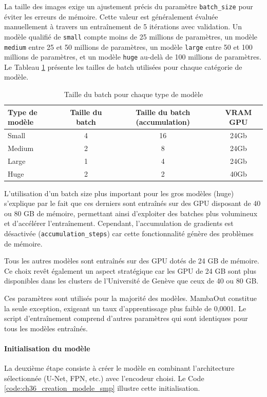 La taille des images exige un ajustement précis du paramètre \texttt{batch\_size} pour éviter les erreurs de mémoire. Cette valeur est généralement évaluée manuellement à travers un entraînement de 5 itérations avec validation. Un modèle qualifié de \texttt{small} compte moins de 25 millions de paramètres, un modèle \texttt{medium} entre 25 et 50 millions de paramètres, un modèle \texttt{large} entre 50 et 100 millions de paramètres, et un modèle \texttt{huge} au-delà de 100 millions de paramètres. Le Tableau \ref{tab:ch36_batch_size} présente les tailles de batch utilisées pour chaque catégorie de modèle.

\begin{table}[H]
    \centering
    \begin{tabular}{@{}lccc@{}}
    \toprule
    \textbf{Type de modèle} & \textbf{Taille du batch} & \textbf{Taille du batch (accumulation)} & \textbf{VRAM GPU} \\
    \midrule
    Small & 4 & 16 & 24Gb \\
    Medium & 2 & 8 & 24Gb \\
    Large & 1 & 4 & 24Gb \\
    Huge & 2 & 2 & 40Gb \\
    \bottomrule
    \end{tabular}
    \caption{Taille du batch pour chaque type de modèle}
    \label{tab:ch36_batch_size}
\end{table}

L'utilisation d'un batch size plus important pour les gros modèles (huge) s'explique par le fait que ces derniers sont entraînés sur des GPU disposant de 40 ou 80 GB de mémoire, permettant ainsi d'exploiter des batches plus volumineux et d'accélérer l'entraînement. Cependant, l'accumulation de gradients est désactivée (\texttt{accumulation\_steps}) car cette fonctionnalité génère des problèmes de mémoire. 

Tous les autres modèles sont entraînés sur des GPU dotés de 24 GB de mémoire. Ce choix revêt également un aspect stratégique car les GPU de 24 GB sont plus disponibles dans les clusters de l'Université de Genève que ceux de 40 ou 80 GB.

Ces paramètres sont utilisés pour la majorité des modèles. MambaOut constitue la seule exception, exigeant un taux d'apprentissage plus faible de 0,0001. Le script d'entraînement comprend d'autres paramètres qui sont identiques pour tous les modèles entraînés.

\paragraph{Initialisation du modèle}
La deuxième étape consiste à créer le modèle en combinant l'architecture sélectionnée (U-Net, FPN, etc.) avec l'encodeur choisi. Le Code \ref{code:ch36_creation_modele_smp} illustre cette initialisation.

